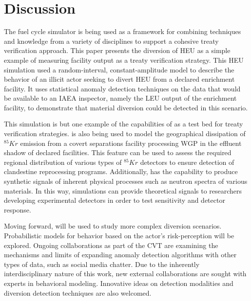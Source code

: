 \section{Discussion}
\label{s_dis}

The \Cyclus fuel cycle simulator is being used as a framework for combining techniques and knowledge from a variety of disciplines to support a cohesive treaty verification approach. This paper presents the diversion of \gls{HEU} as a simple example of measuring facility output as a treaty verification strategy.  This \gls{HEU} simulation used a random-interval, constant-amplitude model to describe the behavior of an illicit actor seeking to divert \gls{HEU} from a declared enrichment facility.  It uses statistical anomaly detection techniques on the data that would be available to an \gls{IAEA} inspector, namely the \gls{LEU} output of the enrichment facility, to demonstrate that material diversion could be detected in this scenario.

This simulation is but one example of the capabilities of \Cyclus as a test bed for treaty verification strategies.  \Cyclus is also being used to model the geographical dissipation of $^{85}Kr$ emission from a covert separations facility processing \gls{WGP} in the effluent shadow of declared facilities.  This feature can be used to assess the required regional distribution of various types of $^{85}Kr$ detectors to ensure detection of clandestine reprocessing programs.  Additionally, \Cyclus has the capability to produce synthetic signals of inherent physical processes such as neutron spectra of various materials.  In this way, \Cyclus simulations can provide theoretical signals to researchers developing experimental detectors in order to test sensitivity and detector response.

Moving forward, \Cyclus will be used to study more complex diversion scenarios.  Probabilistic models for behavior based on the actor's risk-perception will be explored.  Ongoing collaborations as part of the \gls{CVT} are examining the mechanisms and limits of expanding anomaly detection algorithms with other types of data, such as social media chatter.  Due to the inherently interdisciplinary nature of this work, new external collaborations are sought with experts in behavioral modeling. Innovative ideas on detection modalities and diversion detection techniques are also welcomed.



\textit{}
